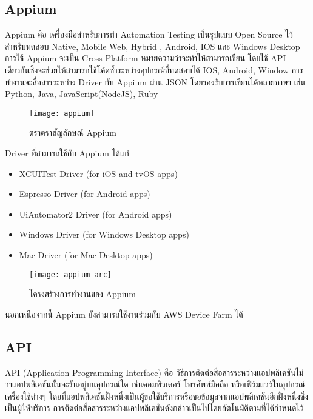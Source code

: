     \subsection{Appium}
        Appium คือ เครื่องมือสำหรับการทำ Automation Testing เป็นรุปแบบ Open Source ไว้สำหรับทดสอบ Native, Mobile Web, Hybrid
        , Android, IOS และ Windows Desktop การใช้ Appium จะเป็น Cross Platform หมายความว่าจะทำให้สามารถเขียน
        โดยใช้ API เดียวกันซึ่งจะช่วยให้สามารถใช้โค้ดซ้ำระหว่างอุปกรณ์ที่ทดสอบได้ IOS, Android, Window การทำงานจะสื่อสารระหว่าง Driver กับ Appium ผ่าน JSON โดยรองรับการเขียนได้หลายภาษา
        เช่น Python, Java, JavaScript(NodeJS), Ruby 
        \begin{figure}[H]
            \centering
            \texttt{[image: appium]}
            \caption{ตราตราสัญลักษณ์ Appium}\label{appium}
        \end{figure}

        Driver ที่สามารถใช้กับ Appium ได้แก่
        \begin{itemize}
            \item XCUITest Driver (for iOS and tvOS apps)
            \item Espresso Driver (for Android apps)
            \item UiAutomator2 Driver (for Android apps)
            \item Windows Driver (for Windows Desktop apps)
            \item Mac Driver (for Mac Desktop apps)
        \end{itemize}

        \begin{figure}[H]
            \centering
            \texttt{[image: appium-arc]}
            \caption{โครงสร้างการทำงานของ Appium}\label{appium-arc}
        \end{figure}

        นอกเหนือจากนี้ Appium ยังสามารถใช้งานร่วมกับ AWS Device Farm ได้

    \subsection{API}
        API (Application Programming Interface) คือ วิธีการติดต่อสื่อสารระหว่างแอปพลิเคชันไม่ว่าแอปพลิเคชันนั้นจะรันอยู่บนอุปกรณ์ใด เช่นคอมพิวเตอร์ โทรศัพท์มือถือ หรือเฟิร์มแวร์ในอุปกรณ์เครื่องใช้ต่างๆ โดยที่แอปพลิเคชันฝั่งหนึ่งเป็นผู้ขอใช้บริการหรือขอข้อมูลจากแอปพลิเคชันอีกฝั่งหนึ่งซึ่งเป็นผู้ให้บริการ การติดต่อสื่อสารระหว่างแอปพลิเคชันดังกล่าวเป็นไปโดยอัตโนมัติตามที่ได้กำหนดไว้

